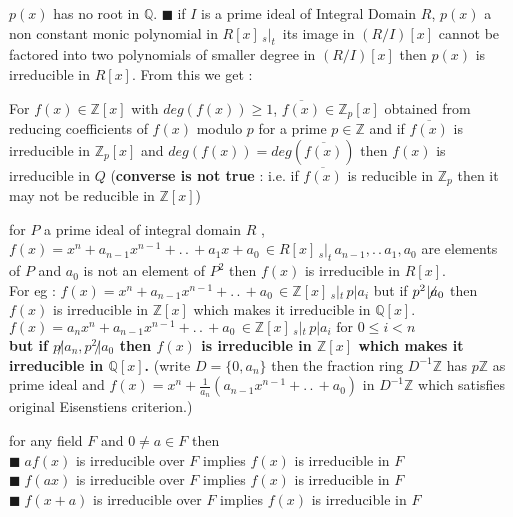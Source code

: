 \documentclass[11pt]{extarticle}
\newcommand{\Z}{\mathbb{Z}}
\newcommand{\Q}{\mathbb{Q}}
\newcommand{\w}[1]{\text{#1}}
\newcommand{\ck}{.\,.\,}
\newcommand{\snote}[1]{{\footnotesize(#1)}}
\newcommand{\st}{\,{}_{s}|_t\,}
\newcommand{\tbx}[2][]{
	\begin{tcolorbox}[enhanced,breakable,size=small,colback=black!2!white,title={#1},arc is angular, arc=1.5mm,drop fuzzy shadow]
		#2
	\end{tcolorbox}
}
\newcommand{\y}{$\blacksquare\;$}
\begin{document}
\begin{multicols}{2}
{{			$ p(x) $  has no root in $ \Q $.}
\y if $ I $ is a prime ideal of Integral Domain $ R $, $ p(x) $ a non constant monic polynomial in $ R[x]\st $ its image in $ (R/I)[x] $ cannot be factored into two polynomials of smaller degree in $ (R/I)[x] $ then $ p(x) $ is irreducible in $ R[x] $. From this we get :}
\tbx[\textbf{Mod $ p $ irreducibility test} ]{For $ f(x)\in \Z[x] $ with $ deg(f(x))\geq 1 $, $ \overline{f(x)} \in \Z_p[x]$ obtained from reducing coefficients of $ f(x) $ modulo $ p $ for a prime $ p\in \Z $ and  if $ \overline{f(x)} $ is irreducible in $ \Z_p[x] $ and $ deg(f(x))=deg(\overline{f(x)}) $ then $ f(x) $ is irreducible in $ Q$  \snote{\textbf{converse is not true} : i.e. if $ \overline{f(x)} $ is reducible in $ \Z_p $ then it may not be reducible in $ \Z[x] $}} 
			
\tbx[\textbf{Eisenstein's Criterion}]{  for $ P $ a prime ideal of integral domain $ R $ , 
			$ f(x)=x^n +a_{n-1}x^{n-1}+\ck + a_1x+a_0 \, \in R[x] \st a_{n-1},\ck a_1,a_0$ are elements of $ P $ and $ a_0 $ is not an element of $ P^2 $ then $ f(x) $ is irreducible in $ R[x] $.\\
			For  eg : $ f(x)=x^n+ a_{n-1}x^{n-1}+\ck + a_0 \, \in \Z[x] \st p|a_i$ but if $ p^2\! \not\!\!| a_0 $ then $ f(x) $ is irreducible in $ \Z[x] $ which makes it irreducible in $ \Q[x] $.\\
			\textbf{$ f(x)=a_n x^n +a_{n-1}x^{n-1}+\ck + a_0 \, \in \Z[x] \st p|a_i \w{ for } 0\leq i<n$ \\
				but if $p\not|a_n, p^2\not| a_0 $ then $ f(x) $ is irreducible in $ \Z[x] $ which makes it irreducible in $ \Q[x] $.} \snote{write $ D=\{0,a_n\} $ then the fraction ring $ D^{-1}\Z $ has $p\Z $ as prime ideal and $ f(x)  =x^n +\frac{ 1 }{a_n} (a_{n-1}x^{n-1}+\ck + a_0 )$ in $ D^{-1}\Z $ which satisfies original Eisenstiens criterion.}}
			
\tbx{for any field $ F $ and $ 0\neq a\in F $ then \\
\y $ af(x) $ is irreducible over $ F $ implies $ f(x) $ is irreducible in $ F $ \\  
\y $ f(ax) $ is irreducible over $ F $ implies $ f(x) $ is irreducible in $ F $ \\
\y $ f(x+a) $ is irreducible over $ F $ implies $ f(x) $ is irreducible in $ F $ 
}


\end{multicols}
\end{document}
